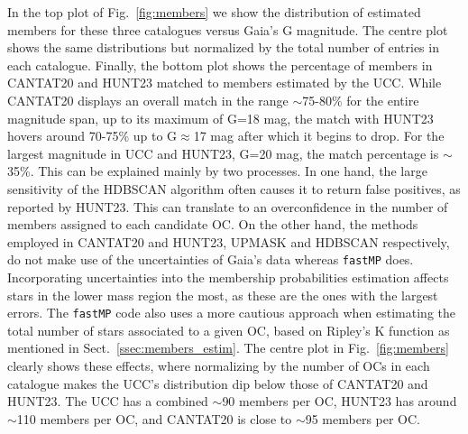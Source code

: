 \documentclass[fleqn,usenatbib]{mnras}
\begin{document}
In the top plot of Fig.~\ref{fig:members} we show the distribution of
estimated members for these three catalogues versus Gaia's G magnitude. The
centre plot shows the same distributions but normalized by the total number of
entries in each catalogue. Finally, the bottom plot shows the percentage of
members in CANTAT20 and HUNT23 matched to members estimated by the UCC. While
CANTAT20 displays an overall match in the range $\sim$75-80\% for the entire
magnitude span, up to its maximum of G=18 mag, the match with HUNT23
hovers around 70-75\% up to G$\approx$17 mag after which it begins to drop.
For the largest magnitude in UCC and HUNT23, G=20 mag, the match
percentage is $\sim$35\%. This can be explained mainly by two processes.
%
In one hand, the large sensitivity of the HDBSCAN algorithm often causes it to
return false positives, as reported by HUNT23. This can translate to
an overconfidence in the number of members assigned to each candidate OC.
On the other hand, the methods employed in CANTAT20 and HUNT23, UPMASK and
HDBSCAN respectively, do not make use of the uncertainties of Gaia's data
whereas \texttt{fastMP} does. Incorporating uncertainties into the membership
probabilities estimation affects stars in the lower mass region the most, as
these are the ones with the largest errors. The \texttt{fastMP} code also uses a
more cautious approach when estimating the total number of stars associated to a
given OC, based on Ripley's K function as mentioned in
Sect.~\ref{ssec:members_estim}. The centre plot in Fig.~\ref{fig:members}
clearly shows these effects, where normalizing by the number of OCs in each
catalogue makes the UCC's distribution dip below those of CANTAT20 and HUNT23.
The UCC has a combined $\sim$90 members per OC, HUNT23 has around $\sim$110
members per OC, and CANTAT20 is close to $\sim$95 members per OC.
%
\end{document}

